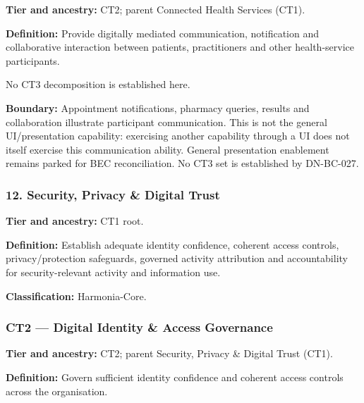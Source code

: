 \textbf{Tier and ancestry:} CT2; parent Connected Health Services (CT1).

\label{rad:business:752}

\textbf{Definition:} Provide digitally mediated communication, notification and collaborative interaction between patients, practitioners and other health-service participants.

\label{rad:business:754}

No CT3 decomposition is established here.

\label{rad:business:756}

\textbf{Boundary:} Appointment notifications, pharmacy queries, results and collaboration illustrate participant communication. This is not the general UI/\allowbreak{}presentation capability: exercising another capability through a UI does not itself exercise this communication ability. General presentation enablement remains parked for BEC reconciliation. No CT3 set is established by DN-BC-027.

\label{rad:business:758}
\subsubsection*{12. Security, Privacy \& Digital Trust}
\label{rad:business:760}

\textbf{Tier and ancestry:} CT1 root.

\label{rad:business:762}

\textbf{Definition:} Establish adequate identity confidence, coherent access controls, privacy/\allowbreak{}protection safeguards, governed activity attribution and accountability for security-relevant activity and information use.

\label{rad:business:764}

\textbf{Classification:} Harmonia-Core.

\label{rad:business:766}
\subsubsection*{CT2 — Digital Identity \& Access Governance}
\label{rad:business:768}

\textbf{Tier and ancestry:} CT2; parent Security, Privacy \& Digital Trust (CT1).

\label{rad:business:770}

\textbf{Definition:} Govern sufficient identity confidence and coherent access controls across the organisation.


